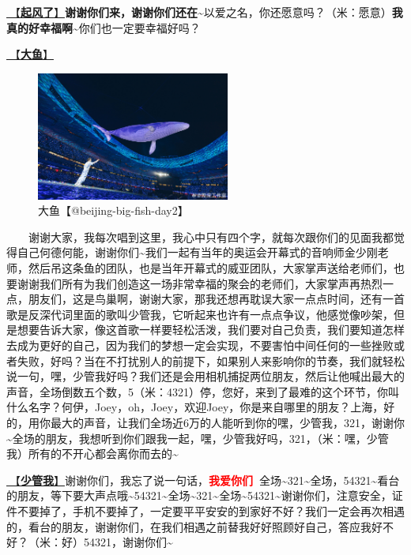 \documentclass[]{ctexbook}
\begin{document}
\hyperref[the-wind-rises]{🎵【\textbf{起风了}】}\textbf{谢谢你们来，谢谢你们还在\textasciitilde{}}以爱之名，你还愿意吗？（米：愿意）\textbf{我真的好幸福啊\textasciitilde{}}你们也一定要幸福好吗？

\hyperref[big-fish]{🎵【\textbf{大鱼}】}

\begin{figure}

{\centering \includegraphics[width=180pt]{img/beijing20240922/big-fish} 

}

\caption{大鱼【@beijing-big-fish-day2】}\label{fig:unnamed-chunk-91}
\end{figure}

  谢谢大家，我每次唱到这里，我心中只有四个字，就每次跟你们的见面我都觉得自己何德何能，谢谢你们\textasciitilde 我们一起有当年的奥运会开幕式的音响师金少刚老师，然后吊这条鱼的团队，也是当年开幕式的威亚团队，大家掌声送给老师们，也要谢谢我们所有为我们创造这一场非常幸福的聚会的老师们，大家掌声再热烈一点，朋友们，这是鸟巢啊，谢谢大家，那我还想再耽误大家一点点时间，还有一首歌是反深代词里面的歌叫少管我，它听起来也许有一点点争议，他感觉像吵架，但是想要告诉大家，像这首歌一样要轻松活泼，我们要对自己负责，我们要知道怎样去成为更好的自己，因为我们的梦想一定会实现，不要害怕中间任何的一些挫败或者失败，好吗？当在不打扰别人的前提下，如果别人来影响你的节奏，我们就轻松说一句，嘿，少管我好吗？我们还是会用相机捕捉两位朋友，然后让他喊出最大的声音，全场倒数五个数，5（米：4321）停，您好，来到了最难的这个环节，你叫什么名字？何伊，Joey，oh，Joey，欢迎Joey，你是来自哪里的朋友？上海，好的，用你最大的声音，让我们全场近6万的人能听到你的嘿，少管我，321，谢谢你\textasciitilde 全场的朋友，我想听到你们跟我一起，嘿，少管我好吗，321，（米：嘿，少管我）所有的不开心都会离你而去的\textasciitilde{}

\hyperref[watch-ur-manners]{🎵【\textbf{少管我}】}谢谢你们，我忘了说一句话，\textbf{\textcolor{red}{我爱你们~}}全场\textasciitilde321\textasciitilde 全场，54321\textasciitilde 看台的朋友，等下要大声点哦\textasciitilde54321\textasciitilde 全场\textasciitilde321\textasciitilde 全场\textasciitilde54321\textasciitilde 谢谢你们，注意安全，证件不要掉了，手机不要掉了，一定要平平安安的到家好不好？我们一定会再次相遇的，看台的朋友，谢谢你们，在我们相遇之前替我好好照顾好自己，答应我好不好？（米：好）54321，谢谢你们\textasciitilde{}
\end{document}
